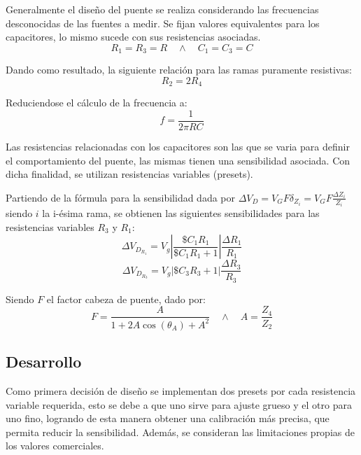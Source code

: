 Generalmente el diseño del puente se realiza considerando las frecuencias desconocidas de las fuentes a medir. Se fijan valores equivalentes para los capacitores, lo mismo sucede con sus resistencias asociadas. 
\begin{equation}
R_1=R_3=R \quad	\wedge \quad C_1=C_3=C
\end{equation}

Dando como resultado, la siguiente relación para las ramas puramente resistivas:
\begin{equation}
R_2=2R_4
\end{equation}

Reduciendose el cálculo de la frecuencia a:
\begin{equation}
f=\frac{1}{2\pi RC}
\label{frec}
\end{equation}

Las resistencias relacionadas con los capacitores son las que se varia para definir el comportamiento del puente, las mismas tienen una sensibilidad asociada. Con dicha finalidad, se utilizan resistencias variables (presets). 

Partiendo de la fórmula para la sensibilidad dada por $\Delta V_D=V_GF\delta_{Z_i}=V_GF\frac{\Delta Z_i}{Z_i}$ siendo $i$ la i-ésima rama, se obtienen las siguientes sensibilidades para las resistencias variables $R_3$ y $R_1$:
\begin{equation}
\Delta V_{D_{R_1}}=V_g\left|\frac{\$C_1R_1}{\$C_1R_1+1}\right|\frac{\Delta R_1}{R_1}
\end{equation}
\begin{equation}
\Delta V_{D_{R_3}}=V_g\left|\$C_3R_3+1\right|\frac{\Delta R_3}{R_3}
\end{equation}

Siendo $F$ el factor cabeza de puente, dado por:
\begin{equation}
F=\frac{A}{1+2A\cos(\theta_A)+A^2} \quad \wedge \quad A=\frac{Z_4}{Z_2}
\label{cabeza_de_puente}
\end{equation} 

\subsection{Desarrollo}

Como primera decisión de diseño se implementan dos presets por cada resistencia variable requerida, esto se debe a que uno sirve para ajuste grueso y el otro para uno fino, logrando de esta manera obtener una calibración más precisa, que permita reducir la sensibilidad. Además, se consideran las limitaciones propias de los valores comerciales.


